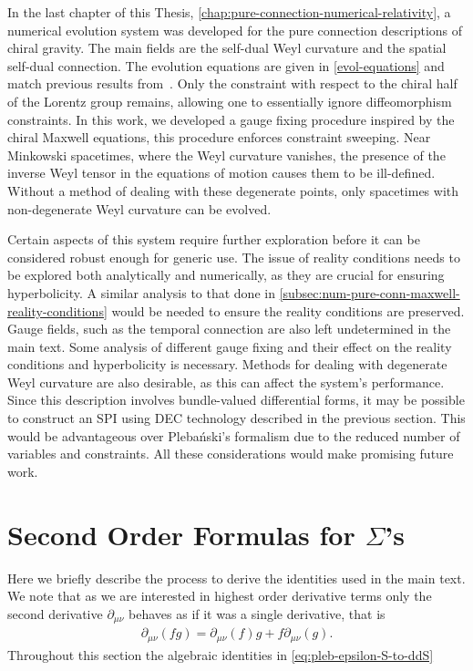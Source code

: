 \documentclass[10pt]{report}
\newcommand{\pleb}[0]{Pleba\'nski}
\theoremstyle{definition}
\begin{document}
    In the last chapter of this Thesis, \cref{chap:pure-connection-numerical-relativity}, a numerical evolution system was developed for the pure connection descriptions of chiral gravity. The main fields are the self-dual Weyl curvature and the spatial self-dual connection. The evolution equations are given in \cref{evol-equations} and match previous results from~\cite{A_connection_ap_Salisb_1994}. Only the constraint with respect to the chiral half of the Lorentz group remains, allowing one to essentially ignore diffeomorphism constraints. In this work, we developed a gauge fixing procedure inspired by the chiral Maxwell equations, this procedure enforces constraint sweeping. Near Minkowski spacetimes, where the Weyl curvature vanishes, the presence of the inverse Weyl tensor in the equations of motion causes them to be ill-defined. Without a method of dealing with these degenerate points, only spacetimes with non-degenerate Weyl curvature can be evolved.

    Certain aspects of this system require further exploration before it can be considered robust enough for generic use. The issue of reality conditions needs to be explored both analytically and numerically, as they are crucial for ensuring hyperbolicity. A similar analysis to that done in \cref{subsec:num-pure-conn-maxwell-reality-conditions} would be needed to ensure the reality conditions are preserved. Gauge fields, such as the temporal connection are also left undetermined in the main text. Some analysis of different gauge fixing and their effect on the reality conditions and hyperbolicity is necessary. Methods for dealing with degenerate Weyl curvature are also desirable, as this can affect the system's performance. Since this description involves bundle-valued differential forms, it may be possible to construct an SPI using DEC technology described in the previous section. This would be advantageous over \pleb{}'s formalism due to the reduced number of variables and constraints. All these considerations would make promising future work.


    \newpage
    \printbibliography

    \appendix

\chapter{\texorpdfstring{Second Order Formulas for $\Sigma$'s}{Second Order Formulas for Σ's}} \label{apx:second-order-formulas-for-Sigma}
        Here we briefly describe the process to derive the identities used in the main text.
        We note that as we are interested in highest order derivative terms only the second derivative $\partial_{\mu\nu}$ behaves as if it was a single derivative, that is 
        \begin{align}
            \partial_{\mu\nu} (fg) = \partial_{\mu\nu}(f) g + f \partial_{\mu\nu}(g).
        \end{align}
        Throughout this section the algebraic identities in \cref{eq:pleb-epsilon-S-to-ddS}
\end{document}
